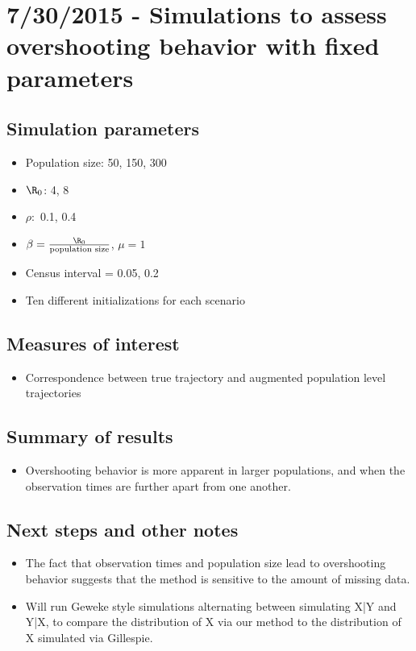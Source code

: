 \section*{7/30/2015 - Simulations to assess overshooting behavior with fixed parameters}
\subsection*{Simulation parameters}
\begin{itemize}
	\item Population size: 50, 150, 300
	\item $ \R_0 $: 4, 8
	\item $ \rho: $ 0.1, 0.4
	\item $ \beta =\frac{\R_0}{\text{population size}} $, $ \mu = 1 $
	\item Census interval = 0.05, 0.2
	\item Ten different initializations for each scenario
\end{itemize}
\subsection*{Measures of interest}
\begin{itemize}
	\item Correspondence between true trajectory and augmented population level trajectories
\end{itemize}
\subsection*{Summary of results}
\begin{itemize}
	\item Overshooting behavior is more apparent in larger populations, and when the observation times are further apart from one another.  
\end{itemize}

\subsection*{Next steps and other notes}
\begin{itemize}
	\item The fact that observation times and population size lead to overshooting behavior suggests that the method is sensitive to the amount of missing data. 
	\item Will run Geweke style simulations alternating between simulating X|Y and Y|X, to compare the distribution of X via our method to the distribution of X simulated via Gillespie.  
\end{itemize}
